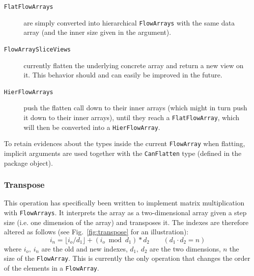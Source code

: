 \documentclass[runningheads,a4paper,fleqn]{llncs}
\begin{document}
\begin{description}
\item[\texttt{FlatFlowArrays}] are simply converted into hierarchical
  \texttt{FlowArrays} with the same data array (and the inner size given in the
  argument).
\item[\texttt{FlowArraySliceViews}] currently flatten the underlying
  concrete array and return a new view on it. This behavior should and
  can easily be improved in the future.
\item[\texttt{HierFlowArrays}] push the flatten call down to their
  inner arrays (which might in turn push it down to their inner
  arrays), until they reach a \texttt{FlatFlowArray}, which will then
  be converted into a \texttt{HierFlowArray}.
\end{description}

To retain evidences about the types inside the current \texttt{FlowArray} when
flatting, implicit arguments are used together with the
\texttt{CanFlatten} type (defined in the package object).

\subsubsection{Transpose}
This operation has specifically been written to implement matrix
multiplication with \texttt{FlowArrays}. It interprets the array as a
two-dimensional array given a step size (i.e. one dimension of the
array) and transposes it. The indexes are therefore altered as
follows (see Fig.~\ref{fig:transpose} for an illustration):
\[ i_n = \lfloor i_o / d_1 \rfloor + (i_o \bmod d_1) * d_2 \qquad (d_1
\cdot d_2 = n)\]
where $i_o,\ i_n$ are the old and new indexes, $d_1,\ d_2$ are the two
dimensions, $n$ the size of the \texttt{FlowArray}. This is currently the only
operation that changes the order of the elements in a \texttt{FlowArray}.
\end{document}

